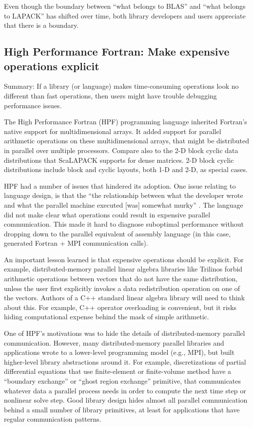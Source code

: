 Even though the boundary between ``what belongs to BLAS'' and ``what
belongs to LAPACK'' has shifted over time, both library developers and
users appreciate that there is a boundary.

\subsection{High Performance Fortran: Make expensive operations
  explicit}\label{SS:other-langs:HPF}

Summary: If a library (or language) makes time-consuming operations
look no different than fast operations, then users might have trouble
debugging performance issues.

The High Performance Fortran (HPF) programming language
\cite{Kennedy2007,Kennedy2011} inherited Fortran's native support for
multidimensional arrays.  It added support for parallel arithmetic
operations on these multidimensional arrays, that might be distributed
in parallel over multiple processors.  Compare also to the 2-D block
cyclic data distributions that ScaLAPACK \cite{Blackford1997} supports
for dense matrices.  2-D block cyclic distributions include block and
cyclic layouts, both 1-D and 2-D, as special cases.

HPF had a number of issues that hindered its adoption.  One issue
relating to language design, is that the ``the relationship between
what the developer wrote and what the parallel machine executed [was]
somewhat murky'' \cite[p. 13]{Kennedy2007}.  The language did not make
clear what operations could result in expensive parallel
communication.  This made it hard to diagnose suboptimal performance
without dropping down to the parallel equivalent of assembly language
(in this case, generated Fortran + MPI communication calls).

An important lesson learned is that expensive operations should be
explicit.  For example, distributed-memory parallel linear algebra
libraries like Trilinos \cite{heroux2005trilinos} forbid arithmetic
operations between vectors that do not have the same distribution,
unless the user first explicitly invokes a data redistribution
operation on one of the vectors.  Authors of a C++ standard linear
algebra library will need to think about this.  For example, C++
operator overloading is convenient, but it risks hiding computational
expense behind the mask of simple arithmetic.

One of HPF's motivations was to hide the details of distributed-memory
parallel communication.  However, many distributed-memory parallel
libraries and applications wrote to a lower-level programming model
(e.g., MPI), but built higher-level library abstractions around it.
For example, discretizations of partial differential equations that
use finite-element or finite-volume method have a ``boundary
exchange'' or ``ghost region exchange'' primitive, that communicates
whatever data a parallel process needs in order to compute the next
time step or nonlinear solve step.  Good library design hides almost
all parallel communication behind a small number of library
primitives, at least for applications that have regular communication
patterns.

